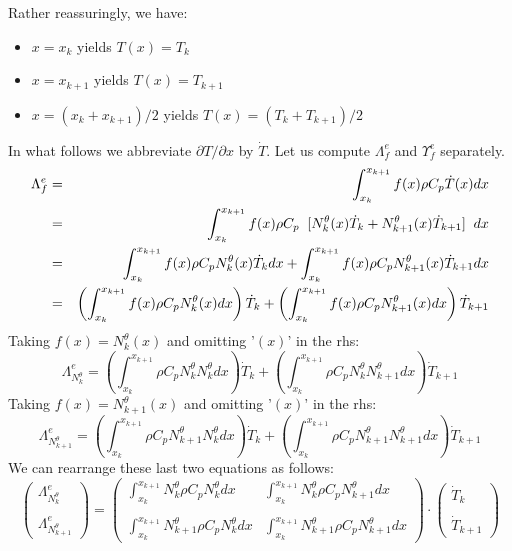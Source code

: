 Rather reassuringly, we have:
\begin{itemize}
\item $x=x_k$ yields $T(x)=T_k$
\item $x=x_{k+1}$ yields $T(x)=T_{k+1}$
\item $x=(x_k+x_{k+1})/2$ yields $T(x)=(T_k+T_{k+1})/2$
\end{itemize}
In what follows we abbreviate $\partial T/\partial x$ by $\dot{T}$.
Let us compute ${\Lambda}_f^e$ and ${\Upsilon}_f^e$ separately.
\begin{eqnarray}
{\Lambda}_f^e 
&=&\int_{x_k}^{x_{k+1}} f(x) \rho C_p \dot T(x) dx \nonumber\\
&=& \int_{x_k}^{x_{k+1}} f(x) \rho C_p \;\;  [ N_{k}^\theta(x) \dot{T}_k + N_{k+1}^\theta(x) \dot{T}_{k+1} ] \;\; dx  \nonumber\\
&=& \int_{x_k}^{x_{k+1}} f(x) \rho C_p N_{k}^\theta(x) \dot{T}_k  dx  
+ \int_{x_k}^{x_{k+1}} f(x) \rho C_p N_{k+1}^\theta(x) \dot{T}_{k+1}   dx \nonumber\\
&=&  \left( \int_{x_k}^{x_{k+1}} f(x) \rho C_p  N_{k}^\theta(x) dx \right) \dot{T}_k  
+ \left( \int_{x_k}^{x_{k+1}} f(x) \rho C_p N_{k+1}^\theta(x) dx \right)  \dot{T}_{k+1}  \nonumber
\end{eqnarray}
Taking $f(x)=N_k^\theta(x)$ and omitting '$(x)$' in the rhs:
\[
{\Lambda}_{N_k^\theta}^e=
\left( \int_{x_k}^{x_{k+1}} \rho C_p  N_k^\theta N_{k}^\theta dx \right) \dot{T}_k  
+ \left( \int_{x_k}^{x_{k+1}} \rho C_p N_k^\theta N_{k+1}^\theta dx \right)  \dot{T}_{k+1} 
\]
Taking $f(x)=N_{k+1}^\theta(x)$ and omitting '$(x)$' in the rhs:
\[
{\Lambda}_{N_{k+1}^\theta}^e
=  \left( \int_{x_k}^{x_{k+1}} \rho C_p N_{k+1}^\theta N_{k}^\theta dx \right) \dot{T}_k  
+ \left( \int_{x_k}^{x_{k+1}}  \rho C_p  N_{k+1}^\theta N_{k+1}^\theta dx \right)  \dot{T}_{k+1} 
\]
We can rearrange these last two equations as follows:
\[
\left(
\begin{array}{c}
{\Lambda}_{N_k^\theta}^e  \\ \\ {\Lambda}_{N_{k+1}^\theta}^e
\end{array}
\right)
=
\left(
\begin{array}{cc}
\int_{x_k}^{x_{k+1}} N_k^\theta     \rho C_p N_{k}^\theta dx  &  \int_{x_k}^{x_{k+1}} N_k^\theta  \rho C_p N_{k+1}^\theta dx \\ \\
\int_{x_k}^{x_{k+1}} N_{k+1}^\theta \rho C_p N_{k}^\theta dx  &  \int_{x_k}^{x_{k+1}} N_{k+1}^\theta \rho C_p N_{k+1}^\theta dx 
\end{array}
\right)
\cdot
\left(
\begin{array}{c}
\dot{T}_k \\ \\
\dot{T}_{k+1}
\end{array}
\right)
\]
